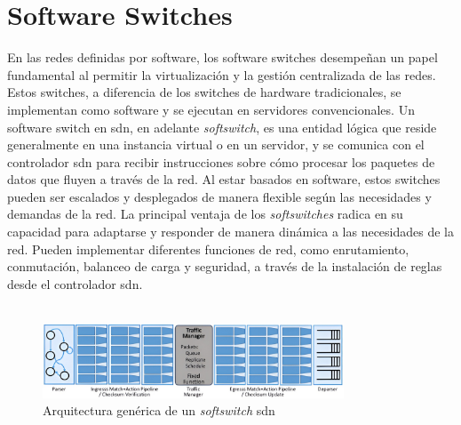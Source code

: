 \section{Software Switches }
\label{sec:softSwitchs}

En las redes definidas por software, los software switches desempeñan un papel fundamental al permitir la virtualización y la gestión centralizada de las redes. Estos switches, a diferencia de los switches de hardware tradicionales, se implementan como software y se ejecutan en servidores convencionales. Un software switch en \gls{sdn}, en adelante \textit{softswitch}, es una entidad lógica que reside generalmente en una instancia virtual o en un servidor, y se comunica con el controlador \gls{sdn} para recibir instrucciones sobre cómo procesar los paquetes de datos que fluyen a través de la red. Al estar basados en software, estos switches pueden ser escalados y desplegados de manera flexible según las necesidades y demandas de la red. La principal ventaja de los \textit{softswitches} radica en su capacidad para adaptarse y responder de manera dinámica a las necesidades de la red. Pueden implementar diferentes funciones de red, como enrutamiento, conmutación, balanceo de carga y seguridad, a través de la instalación de reglas desde el controlador \gls{sdn}. \\
\\
\begin{figure}[ht]
    \centering
    \includegraphics[width=0.8\textwidth]{archivos/img/teoria/softswitch.jpg}
    \caption{Arquitectura genérica de un \textit{softswitch} \gls{sdn} \cite{softswitches1}}
    \label{fig:softswitch}
\end{figure}

